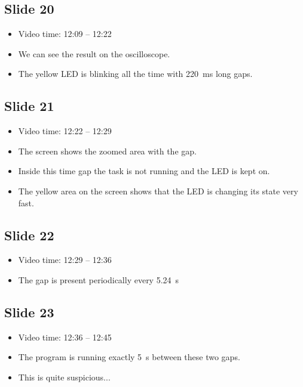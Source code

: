 \documentclass[12pt, a4paper]{article}
\begin{document}
	\subsection{Slide 20}
	\begin{itemize}
		\item Video time: 12:09 -- 12:22
		\item We can see the result on the oscilloscope.
		\item The yellow LED is blinking all the time with \SI{220}{ms} long gaps.
	\end{itemize}
	
	\subsection{Slide 21}
	\begin{itemize}
		\item Video time: 12:22 -- 12:29
		\item The screen shows the zoomed area with the gap.
		\item Inside this time gap the task is not running and the LED is kept on.
		\item The yellow area on the screen shows that the LED is changing its state very fast.
	\end{itemize}

	\subsection{Slide 22}
	\begin{itemize}
		\item Video time: 12:29 -- 12:36
		\item The gap is present periodically every \SI{5.24}{s}
	\end{itemize}

	\subsection{Slide 23}
	\begin{itemize}
		\item Video time: 12:36 -- 12:45
		\item The program is running exactly \SI{5}{s} between these two gaps.
		\item This is quite suspicious...
	\end{itemize}
\end{document}
